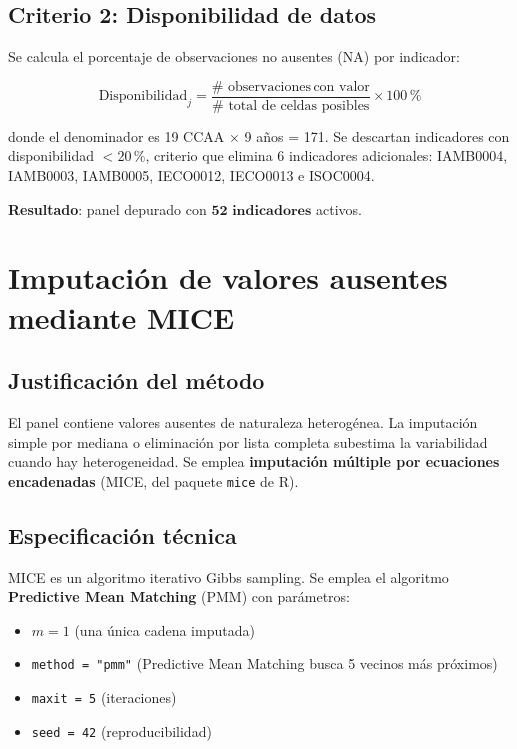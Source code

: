 \subsection{Criterio 2: Disponibilidad de datos}

Se calcula el porcentaje de observaciones no ausentes (NA) por indicador:

\begin{equation}
    \text{Disponibilidad}_j = \frac{\text{# observaciones} \, \text{con valor}}{\text{# total de celdas posibles}} \times 100\,\%
\end{equation}

donde el denominador es 19 CCAA $\times$ 9 años = 171. Se descartan indicadores con disponibilidad $< 20\,\%$, criterio que elimina 6 indicadores adicionales: IAMB0004, IAMB0003, IAMB0005, IECO0012, IECO0013 e ISOC0004.

\textbf{Resultado}: panel depurado con $\mathbf{52 \text{ indicadores}}$ activos.

\section{Imputación de valores ausentes mediante MICE}

\subsection{Justificación del método}

El panel contiene valores ausentes de naturaleza heterogénea. La imputación simple por mediana o eliminación por lista completa subestima la variabilidad cuando hay heterogeneidad. Se emplea \textbf{imputación múltiple por ecuaciones encadenadas} (MICE, del paquete \texttt{mice} de R).

\subsection{Especificación técnica}

MICE es un algoritmo iterativo Gibbs sampling. Se emplea el algoritmo \textbf{Predictive Mean Matching} (PMM) con parámetros:
\begin{itemize}
    \item $m = 1$ (una única cadena imputada)
    \item \texttt{method = "pmm"} (Predictive Mean Matching busca 5 vecinos más próximos)
    \item \texttt{maxit = 5} (iteraciones)
    \item \texttt{seed = 42} (reproducibilidad)
\end{itemize}

